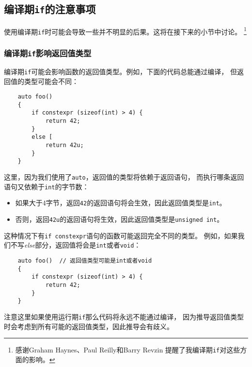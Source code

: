 \subsection{编译期\texttt{if}的注意事项}
使用编译期\texttt{if}时可能会导致一些并不明显的后果。这将在接下来的小节中讨论。
\footnote{感谢Graham Haynes、Paul Reilly和Barry Revzin
提醒了我编译期\texttt{if}对这些方面的影响。}

\subsubsection{编译期\texttt{if}影响返回值类型}
编译期\texttt{if}可能会影响函数的返回值类型。例如，下面的代码总能通过编译，
但返回值的类型可能会不同：
\begin{lstlisting}
    auto foo()
    {
        if constexpr (sizeof(int) > 4) {
            return 42;
        }
        else [
            return 42u;
        }
    }
\end{lstlisting}
这里，因为我们使用了\texttt{auto}，返回值的类型将依赖于返回语句，
而执行哪条返回语句又依赖于\texttt{int}的字节数：
\begin{itemize}
    \item 如果大于4字节，返回\texttt{42}的返回语句将会生效，因此返回值类型是\texttt{int}。
    \item 否则，返回\texttt{42u}的返回语句将生效，因此返回值类型是\texttt{unsigned int}。
\end{itemize}
这种情况下有\texttt{if constexpr}语句的函数可能返回完全不同的类型。
例如，如果我们不写\emph{else}部分，返回值将会是\texttt{int}或者\texttt{void}：
\begin{lstlisting}
    auto foo()  // 返回值类型可能是int或者void
    {
        if constexpr (sizeof(int) > 4) {
            return 42;
        }
    }
\end{lstlisting}
注意这里如果使用运行期\texttt{if}那么代码将永远不能通过编译，
因为推导返回值类型时会考虑到所有可能的返回值类型，因此推导会有歧义。

